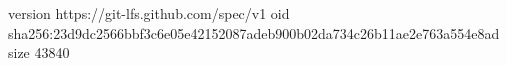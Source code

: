 version https://git-lfs.github.com/spec/v1
oid sha256:23d9dc2566bbf3c6e05e42152087adeb900b02da734c26b11ae2e763a554e8ad
size 43840
